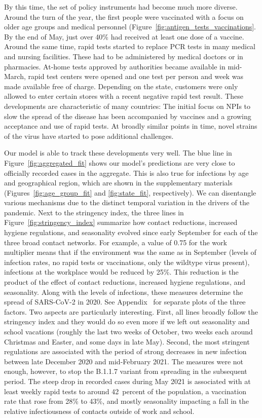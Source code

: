 By this time, the set of policy instruments had become much more diverse. Around the
turn of the year, the first people were vaccinated with a focus on older age groups and
medical personnel (Figure~\ref{fig:antigen_tests_vaccinations}. By the end of May, just
over 40\% had received at least one dose of a vaccine. Around the same time, rapid tests
started to replace PCR tests in many medical and nursing facilities. These had to be
administered by medical doctors or in pharmacies. At-home tests approved by authorities
became available in mid-March, rapid test centers were opened and one test per person
and week was made available free of charge. Depending on the state, customers were only
allowed to enter certain stores with a recent negative rapid test result. These
developments are characteristic of many countries: The initial focus on NPIs to slow the
spread of the disease has been accompanied by vaccines and a growing acceptance and use
of rapid tests. At broadly similar points in time, novel strains of the virus have
started to pose additional challenges.

Our model is able to track these developments very well. The blue line in
Figure~\ref{fig:aggregated_fit} shows our model's predictions are very close to
officially recorded cases in the aggregate. This is also true for infections by age and
geographical region, which are shown in the supplementary materials
(Figures~\ref{fig:age_group_fit} and \ref{fig:state_fit}, respectively). We can
disentangle various mechanisms due to the distinct temporal variation in the drivers of
the pandemic. Next to the stringency index, the three lines in
Figure~\ref{fig:stringency_index} summarize how contact reductions, increased hygiene
regulations, and seasonality evolved since early September for each of the three broad
contact networks. For example, a value of 0.75 for the work multiplier means that if the
environment was the same as in September (levels of infection rates, no rapid tests or
vaccinations, only the wildtype virus present), infections at the workplace would be
reduced by 25\%. This reduction is the product of the effect of contact reductions,
increased hygiene regulations, and seasonality. Along with the levels of infections,
these measures determine the spread of SARS-CoV-2 in 2020. See
Appendix~ for separate plots of the three factors. Two aspects
are particularly interesting. First, all lines broadly follow the stringency index and
they would do so even more if we left out seasonality and school vacations (roughly the
last two weeks of October, two weeks each around Christmas and Easter, and some days in
late May). Second, the most stringent regulations are associated with the period of
strong decreases in new infection between late December 2020 and mid-February 2021. The
measures were not enough, however, to stop the B.1.1.7 variant from spreading in the
subsequent period. The steep drop in recorded cases during May 2021 is associated with
at least weekly rapid tests to around 42~percent of the population, a vaccination rate
that rose from 28\% to 43\%, and mostly seasonality impacting a fall in the relative
infectiousness of contacts outside of work and school.

